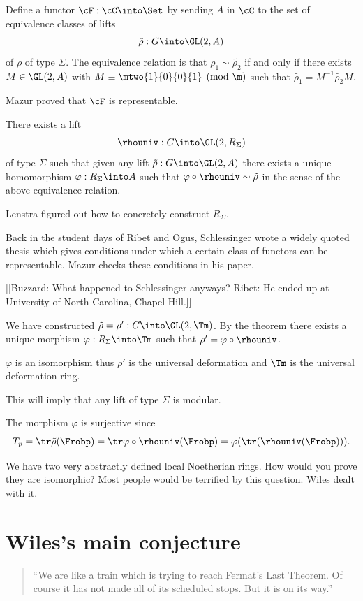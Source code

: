 \documentclass{report}
\begin{document}
Define a functor $\cF:\cC\into\Set$ by sending $A$ in $\cC$
to the set of equivalence classes of lifts
$$\tilde{\rho}:G\into\GL(2,A)$$
of $\rho$ of type $\Sigma$. The equivalence relation is
that $\tilde{\rho_1}\sim\tilde{\rho_2}$ if and only if there exists
$M\in\GL(2,A)$ with $M\equiv\mtwo{1}{0}{0}{1}\pmod{\m}$ such
that $\tilde{\rho_1}=M^{-1}\tilde{\rho_2}M.$

Mazur proved \cite{mazur:deforming}
that $\cF$ is representable.
\begin{theorem}
There exists a lift
$$\rhouniv:G\into\GL(2,R_{\Sigma})$$
of type $\Sigma$ such that given any lift
$\tilde{\rho}:G\into\GL(2,A)$ there
exists a unique homomorphism $\varphi:R_{\Sigma}\into A$ such that
$\varphi\circ\rhouniv\sim\tilde{\rho}$ in the sense of the
above equivalence relation. \end{theorem}

Lenstra figured out how to concretely construct $R_{\Sigma}$.

Back in the student days of Ribet and Ogus, Schlessinger
wrote a widely quoted thesis which gives conditions under which
a certain class of functors can be representable. Mazur checks these
conditions in his paper.

[[Buzzard: What happened to Schlessinger anyways?
  Ribet: He ended up at University of North Carolina, Chapel Hill.]]

We have constructed
$\tilde{\rho}=\rho':G\into\GL(2,\Tm)$. By the theorem
there exists a unique morphism $\varphi:R_{\Sigma}\into\Tm$
such that $\rho'=\varphi\circ\rhouniv$.
\begin{theorem} $\varphi$ is an isomorphism thus $\rho'$ is the
universal deformation and $\Tm$ is the universal deformation ring.
\end{theorem}
This will imply that any lift of type $\Sigma$ is modular.

The morphism $\varphi$ is surjective since
$$T_p=\tr\tilde{\rho}(\Frobp)=\tr\varphi\circ\rhouniv(\Frobp)
         =\varphi(\tr(\rhouniv(\Frobp))).$$

We have two very abstractly defined local Noetherian rings. How would you
prove they are isomorphic? Most people would be
terrified by this question. Wiles dealt with it.


\section{Wiles's main conjecture}
\begin{quote}
``We are like a train which is trying to reach Fermat's Last Theorem.
Of course it has not made all of its scheduled stops. But it is on its way.''
\end{quote}
\end{document}
